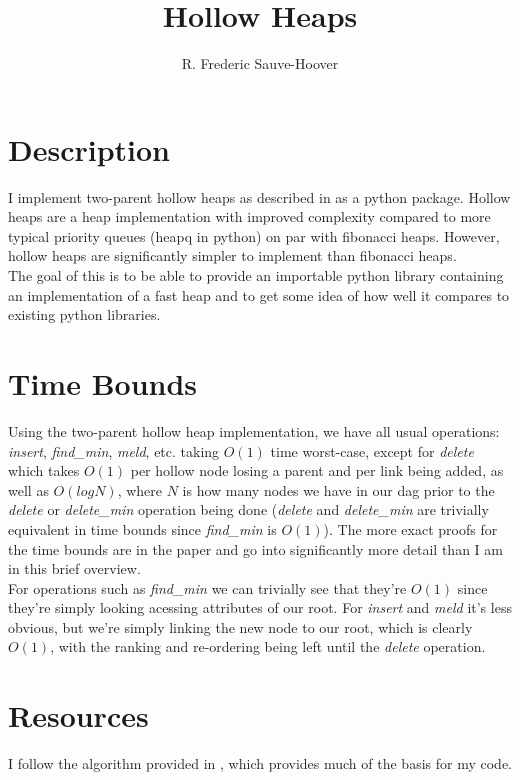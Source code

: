 \documentclass[10pt]{article}
\begin{document}
\title{Hollow Heaps}
\author{R. Frederic Sauve-Hoover}
\maketitle

\section*{Description}
I implement two-parent hollow heaps as described in \cite{hansen2015hollow} as a python package. Hollow heaps are a heap implementation with 
improved complexity compared to more typical priority queues (heapq in python) on par with fibonacci heaps. However, hollow heaps are significantly simpler to implement than fibonacci heaps.\\

The goal of this is to be able to provide an importable python library containing an implementation of a fast heap and to get some idea of how well it compares to existing python libraries.\\

\section*{Time Bounds}
Using the two-parent hollow heap implementation, we have all usual operations: \emph{insert}, \emph{find\_min}, \emph{meld}, etc. taking $O(1)$ time worst-case, except for \emph{delete} which takes $O(1)$ per hollow node losing a parent and per link being added, as well as $O(logN)$, where $N$ is how many nodes we have in our dag prior to the \emph{delete} or \emph{delete\_min} operation being done (\emph{delete} and \emph{delete\_min} are trivially equivalent in time bounds since \emph{find\_min} is $O(1)$). The more exact proofs for the time bounds are in the paper and go into significantly more detail than I am in this brief overview.\\

For operations such as \emph{find\_min} we can trivially see that they're $O(1)$ since they're simply looking acessing attributes of our root. For \emph{insert} and \emph{meld} it's less obvious, but 
we're simply linking the new node to our root, which is clearly $O(1)$, with the ranking and re-ordering being left until the \emph{delete} operation.

\section*{Resources}
I follow the algorithm provided in \cite{hansen2015hollow}, which provides much of the basis for my code.
\end{document}
